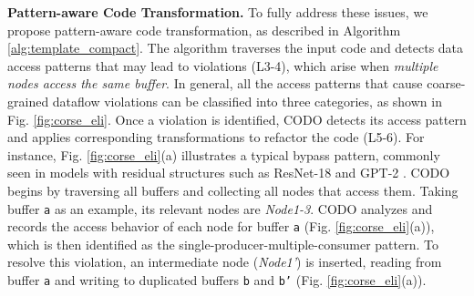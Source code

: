 \documentclass[conference]{IEEEtran}
\begin{document}
\textbf{Pattern-aware Code Transformation.} 
To fully address these issues, we propose pattern-aware code transformation, as described in Algorithm \ref{alg:template_compact}. The algorithm traverses the input code and detects data access patterns that may lead to violations (L3-4), which arise when \textit{multiple nodes access the same buffer}. In general, all the access patterns that cause coarse-grained dataflow violations can be classified into three categories, as shown in Fig. \ref{fig:corse_eli}. Once a violation is identified, CODO detects its access pattern
and applies corresponding transformations to refactor the code (L5-6). 
For instance, Fig. \ref{fig:corse_eli}(a) illustrates a typical bypass pattern, commonly seen in models with residual structures such as ResNet-18 \cite{he2016deep} and GPT-2 \cite{Radford2019LanguageMA}. CODO begins by traversing all buffers and collecting all nodes that access them. Taking buffer \texttt{a} as an example, its relevant nodes are \textit{Node1-3}. CODO analyzes and records the access behavior of each node for buffer \texttt{a} (Fig. \ref{fig:corse_eli}(a)), which is then identified as the single-producer-multiple-consumer pattern.
To resolve this violation, 
an intermediate node (\textit{Node1'}) is inserted, reading
from buffer \texttt{a} and writing to duplicated buffers \texttt{b} and \texttt{b'} (Fig. \ref{fig:corse_eli}(a)).
\end{document}
